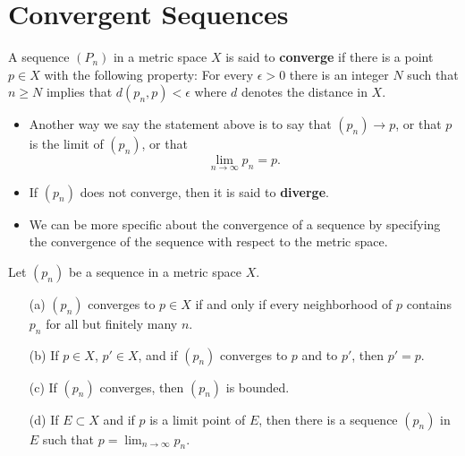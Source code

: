 \documentclass[11pt,a4paper]{book}
\begin{document}
\section{Convergent Sequences}

\begin{definition}[3.1]
   A sequence \( ({P}_{n}) \) in a metric space \( X  \) is said to \textbf{converge} if there is a point \( p \in X  \) with the following property: For every \( \epsilon > 0  \) there is an integer \( N  \) such that \( n \geq N  \) implies that \( d({p}_{n}, p) < \epsilon  \) where \( d  \) denotes the distance in \( X  \). 
\end{definition}

\begin{itemize}
    \item Another way we say the statement above is to say that \( ({p}_{n}) \to p  \), or that \( p  \) is the limit of \( ({p}_{n}) \), or that
\[  \lim_{ n \to \infty  } {p}_{n} = p. \]
    \item If \( ({p}_{n}) \) does not converge, then it is said to \textbf{diverge}.
    \item We can be more specific about the convergence of a sequence by specifying the convergence of the sequence with respect to the metric space.
\end{itemize}

\begin{theorem}[3.2]
   Let \( ({p}_{n}) \) be a sequence in a metric space \( X  \). 
   \begin{enumerate}
       \item[(a)] \( ({p}_{n}) \) converges to \( p \in X  \) if and only if every neighborhood of \( p  \) contains \( {p}_{n} \) for all but finitely many \( n \).
       \item[(b)] If \( p \in X  \), \( p' \in X  \), and if \( ({p}_{n}) \) converges to \( p  \) and to \( p' \), then \( p' = p \).  
        \item[(c)] If \( ({p}_{n}) \) converges, then \( ({p}_{n}) \) is bounded.
        \item[(d)] If \( E \subset X  \) and if \( p  \) is a limit point of \( E  \), then there is a sequence \( ({p}_{n}) \) in \( E  \) such that \( p = \lim_{ n \to \infty  } {p}_{n}  \).
   \end{enumerate}
\end{theorem}
\end{document}
